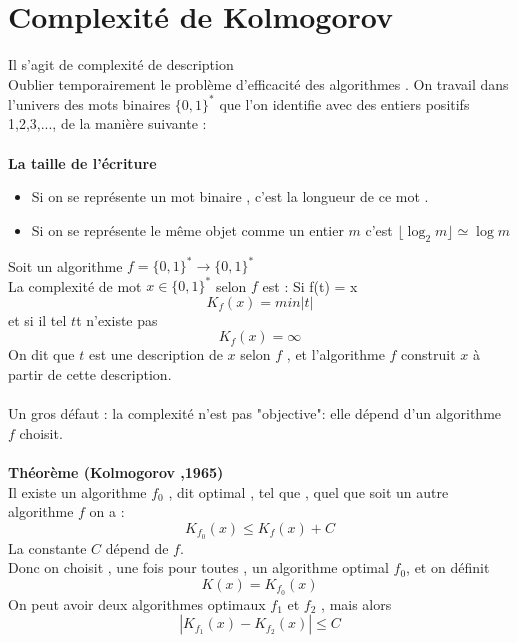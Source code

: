 \documentclass[base.tex]{subfiles}
\begin{document}
\section{Complexité de Kolmogorov}
Il s'agit de complexité de description\\
Oublier temporairement le problème d'efficacité des algorithmes . On travail dans l'univers des mots binaires $\{0,1\}^*$ que l'on identifie avec des entiers positifs 1,2,3,..., de la manière suivante :
\\
\\
\textbf{La taille de l'écriture }
\begin{itemize}
\item Si on se représente un mot binaire , c'est la longueur de ce mot .
  \item Si on se représente le même objet comme un entier $m$ c'est $\lfloor \log _2 m \rfloor\simeq \log m$
\end{itemize}
\medskip
Soit un algorithme $f=\{0,1\}^* \rightarrow \{0,1\}^*$ \\
La complexité de mot $x \in \{0,1\}^*$ selon $f$ est : %
Si f(t) = x
\[K_f(x)=min|t|\]
et si il tel $t$t n'existe pas 
\[K_f(x)=\infty\]
On dit que $t$ est une description de $x$ selon $f$ , et l'algorithme $f$ construit $x$ à partir de cette description.\\
\\
Un gros défaut : la complexité n'est pas "objective": elle dépend d'un algorithme $f$ choisit.\\
\\
\textbf{Théorème (Kolmogorov ,1965)}\\
Il existe un algorithme $f_0$ , dit optimal , tel que , quel que soit un autre algorithme $f$ on a :
\[K_{f_0}(x) \leq K_f(x) +C\]
La constante $C$ dépend de $f$.
\\
Donc on choisit , une fois pour toutes , un algorithme optimal $f_0$, et on définit
\[K(x) =K_{f_0}(x)\]
On peut avoir deux algorithmes optimaux $f_1$ et $f_2$ , mais alors
\[|K_{f_1}(x)-K_{f_2}(x)| \leq C\]
\end{document}
